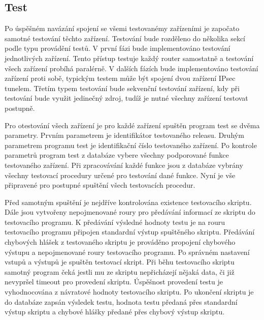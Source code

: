 \subsection{Test}
Po úspěšném navázání spojení se všemi testovanémy zařízeními je započato samotné testování těchto zařízení. Testování bude rozděleno do několika sekcí podle typu provádění testů. V první fázi bude implementováno testování jednotlivých zařízení. Tento přístup testuje každý router samostatně a testování všech zařízení probíhá paralérně. V dalších fázích bude implementováno testování zařízení proti sobě, typickým testem může být spojení dvou zařízení IPsec tunelem. Třetím typem testování bude sekvenční testování zařízení, kdy při testování bude využit jedinečný zdroj, tudíž je nutné všechny zařízení testovat postupně.

Pro otestování všech zařízení je pro každé zařízení spuštěn program test se dvěma parametry. Prvním parametrem je identifikátor testovaného releasu. Druhým parametrem programu test je identifikační číslo testovaného zařízení. Po kontrole parametrů program test z databáze vybere všechny podporované funkce testovaného zařízení. Při zpracovávání každé funkce jsou z databáze vybrány všechny testovací procedury určené pro testování dané funkce. Nyní je vše připravené pro postupné spuštění všech testovacích procedur.

Před samotným spuštění je nejdříve kontrolována existence testovacího skriptu. Dále jsou vytvořeny nepojmenované roury pro předávání informací ze skriptu do testovacího programu. K předávání výsledné hodnoty testu je na rouru testovacího programu připojen standardní výstup spuštěného skriptu. Předávání chybových hlášek z testovaného skriptu je prováděno propojení chybového výstupu a nepojmenované roury testovacího programu. Po správném nastavení vstupů a výstupů je spuštěn testovací skript. Při běhu testovacího skriptu samotný program čeká jestli mu ze skriptu nepřicházejí nějaká data, či již nevypršel timeout pro provedení skriptu. Úspěšnost provedení testu je vyhodnocována z návratové hodnoty testovacího skriptu. Po ukončení skriptu je do databáze zapsán výsledek testu, hodnota testu předaná přes standardní výstup skriptu a chybové hlášky předané přes chybový výstup skriptu.

